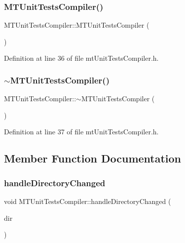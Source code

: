 \subsubsection{\texorpdfstring{M\+T\+Unit\+Tests\+Compiler()}{MTUnitTestsCompiler()}}
{\footnotesize\ttfamily M\+T\+Unit\+Tests\+Compiler\+::\+M\+T\+Unit\+Tests\+Compiler (\begin{DoxyParamCaption}{ }\end{DoxyParamCaption})\hspace{0.3cm}{\ttfamily [inline]}}



Definition at line 36 of file mt\+Unit\+Tests\+Compiler.\+h.

\mbox{\label{class_m_t_unit_tests_compiler_a455bbf3b47473ebb553a78421f538f23}} 
\subsubsection{\texorpdfstring{$\sim$\+M\+T\+Unit\+Tests\+Compiler()}{~MTUnitTestsCompiler()}}
{\footnotesize\ttfamily M\+T\+Unit\+Tests\+Compiler\+::$\sim$\+M\+T\+Unit\+Tests\+Compiler (\begin{DoxyParamCaption}{ }\end{DoxyParamCaption})\hspace{0.3cm}{\ttfamily [inline]}}



Definition at line 37 of file mt\+Unit\+Tests\+Compiler.\+h.



\subsection{Member Function Documentation}
\mbox{\label{class_m_t_unit_tests_compiler_a87e718123e996863f9eeae8e50967407}} 
\subsubsection{\texorpdfstring{handle\+Directory\+Changed}{handleDirectoryChanged}}
{\footnotesize\ttfamily void M\+T\+Unit\+Tests\+Compiler\+::handle\+Directory\+Changed (\begin{DoxyParamCaption}\item[{Q\+String}]{dir }\end{DoxyParamCaption})\hspace{0.3cm}{\ttfamily [slot]}}



